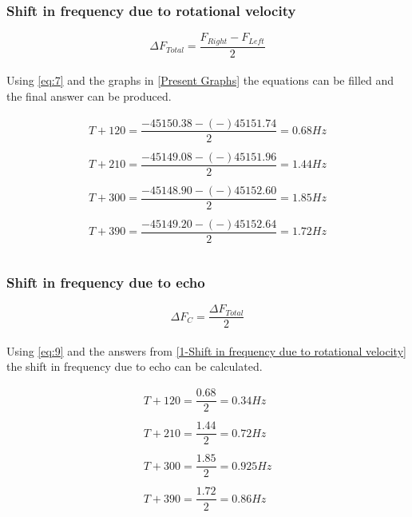 \documentclass[11pt]{article}
\begin{document}
\begin{multicols}{2}

\subsubsection{Shift in frequency due to rotational velocity}

\begin{equation} \label{eq:7}
{\Delta F_{Total} = \dfrac{F_{Right} - {F_{Left}}}{2}}
\end{equation}\\

Using \cref{eq:7} and the graphs in \cref{Present Graphs} the equations can be filled and the final answer can be produced.

\begin{equation}\label{1-Shift in frequency due to rotational velocity}
\begin{split}
{T+120 = \dfrac{-45150.38 - (-)45151.74}{2}} = 0.68Hz \\
\\
{T+210 = \dfrac{-45149.08 - (-)45151.96}{2}} = 1.44Hz \\
\\
{T+300 = \dfrac{-45148.90 - (-)45152.60}{2}} = 1.85Hz \\
\\
{T+390 = \dfrac{-45149.20 - (-)45152.64}{2}} = 1.72Hz \\
\\
\end{split}
\end{equation}


\subsubsection{Shift in frequency due to echo}

\begin{equation} \label{eq:9}
{\Delta F_{C} = \dfrac{\Delta F_{Total}}{2}}
\end{equation}\\

Using \cref{eq:9} and the answers from \cref{1-Shift in frequency due to rotational velocity} the shift in frequency due to echo can be calculated.

\begin{equation}\label{1-Shift in frequency due to echo}
\begin{split}
{T+120 = \dfrac{0.68}{2}} = 0.34Hz \\
\\
{T+210 = \dfrac{1.44}{2}} = 0.72Hz \\
\\
{T+300 = \dfrac{1.85}{2}} = 0.925Hz \\
\\
{T+390 = \dfrac{1.72}{2}} = 0.86Hz \\
\\
\end{split}
\end{equation}


\end{multicols}
\end{document}
